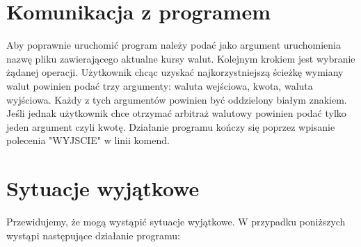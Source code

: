 \documentclass{article}
\begin{document}
\section{Komunikacja z programem}
Aby poprawnie uruchomić program należy podać jako argument uruchomienia nazwę pliku zawierającego aktualne kursy walut.
\newline\newline
Kolejnym krokiem jest wybranie żądanej operacji. Użytkownik chcąc uzyskać najkorzystniejszą ścieżkę wymiany walut powinien podać trzy argumenty: waluta wejściowa, kwota, waluta wyjściowa. Każdy z tych argumentów powinien być oddzielony białym znakiem. Jeśli jednak użytkownik chce otrzymać arbitraż walutowy powinien podać tylko jeden argument czyli kwotę.
\newline\newline
Działanie programu kończy się poprzez wpisanie polecenia "WYJSCIE" w linii komend.  
\newline\newline



\section{Sytuacje wyjątkowe}
Przewidujemy, że mogą wystąpić sytuacje wyjątkowe. W przypadku poniższych
wystąpi następujące działanie programu:
\end{document}
